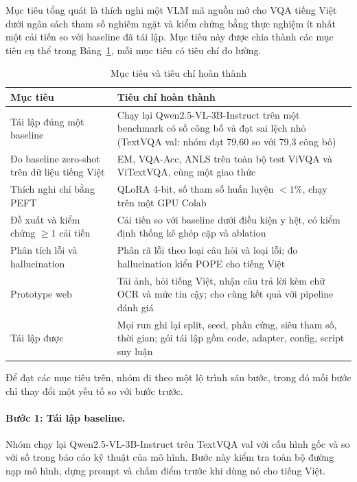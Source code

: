 Mục tiêu tổng quát là thích nghi một VLM mã nguồn mở cho VQA tiếng Việt dưới
ngân sách tham số nghiêm ngặt và kiểm chứng bằng thực nghiệm ít nhất một cải
tiến so với baseline đã tái lập. Mục tiêu này được chia thành các mục tiêu cụ
thể trong Bảng~\ref{tab:objectives}, mỗi mục tiêu có tiêu chí đo lường.

\begin{table}[htbp]
\caption{Mục tiêu và tiêu chí hoàn thành}
\label{tab:objectives}
\centering
\small
\begin{tabular}{p{}p{}}
\toprule
\textbf{Mục tiêu} & \textbf{Tiêu chí hoàn thành} \\
\midrule
Tái lập đúng một baseline &
Chạy lại Qwen2.5-VL-3B-Instruct trên một benchmark có số công bố và đạt sai lệch
nhỏ (TextVQA val: nhóm đạt 79,60 so với 79,3 công bố) \\
Đo baseline zero-shot trên dữ liệu tiếng Việt &
EM, VQA-Acc, ANLS trên toàn bộ test ViVQA và ViTextVQA, cùng một giao thức \\
Thích nghi chỉ bằng PEFT &
QLoRA 4-bit, số tham số huấn luyện $<1\%$, chạy trên một GPU Colab \\
Đề xuất và kiểm chứng $\geq 1$ cải tiến &
Cải tiến so với baseline dưới điều kiện y hệt, có kiểm định thống kê ghép cặp và
ablation \\
Phân tích lỗi và hallucination &
Phân rã lỗi theo loại câu hỏi và loại lỗi; đo hallucination kiểu POPE cho tiếng
Việt \\
Prototype web &
Tải ảnh, hỏi tiếng Việt, nhận câu trả lời kèm chữ OCR và mức tin cậy; cho cùng
kết quả với pipeline đánh giá \\
Tái lập được &
Mọi run ghi lại split, seed, phần cứng, siêu tham số, thời gian; gói tái lập gồm
code, adapter, config, script suy luận \\
\bottomrule
\end{tabular}
\end{table}

Để đạt các mục tiêu trên, nhóm đi theo một lộ trình sáu bước, trong đó mỗi bước
chỉ thay đổi một yếu tố so với bước trước.

\paragraph{Bước 1: Tái lập baseline.} Nhóm chạy lại Qwen2.5-VL-3B-Instruct trên
TextVQA val với cấu hình gốc và so với số trong báo cáo kỹ thuật của mô hình.
Bước này kiểm tra toàn bộ đường nạp mô hình, dựng prompt và chấm điểm trước khi
dùng nó cho tiếng Việt.

